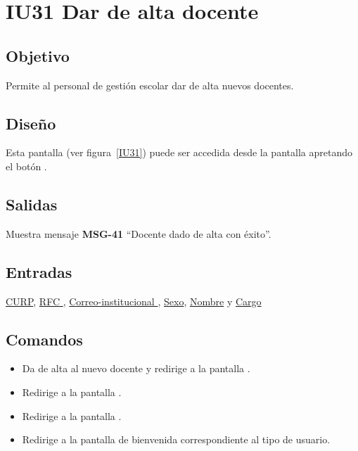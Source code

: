 
\section{IU31 Dar de alta docente}
\subsection{Objetivo}
    Permite al personal de gestión escolar dar de alta nuevos docentes.
\subsection{Diseño}
    Esta pantalla  (ver figura~\ref{IU31}) puede ser accedida desde la pantalla  apretando el botón .

\subsection{Salidas}
Muestra mensaje {\bf MSG-41} ``Docente dado de alta con éxito''.
\subsection{Entradas}
\hyperlink{Docente.CURP }{CURP}, \hyperlink{Docente.RFC }{RFC }, \hyperlink{Docente.Correo-institucional}{ Correo-institucional }, \hyperlink{Docente.Sexo}{Sexo}, \hyperlink{ Docente.Nombre}{Nombre} y \hyperlink{Docente.Cargo}{Cargo}
\subsection{Comandos}
\begin{itemize}
    \item {} Da de alta al nuevo docente y redirige a la pantalla .
    \item {} Redirige a la pantalla .
    \item {} Redirige a la pantalla .
    \item {} Redirige a la pantalla de bienvenida correspondiente al tipo de usuario.
    
\end{itemize}

